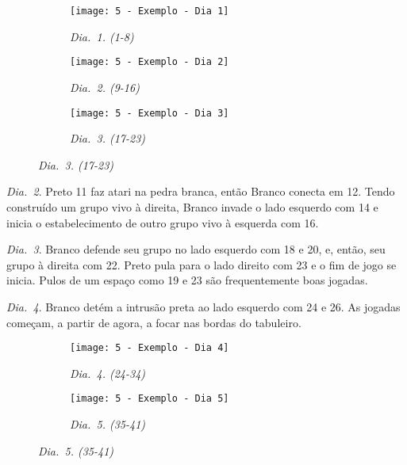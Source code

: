 \begin{figure}[h!]
  \centering
  \begin{subfigure}[t]{.3\textwidth}
    \centering
    \texttt{[image: 5 - Exemplo - Dia 1]}
    \captionsetup{justification=centering}
    \caption*{\emph{Dia.\@~1. (1-8)}}
  \end{subfigure}
  \hfill
  \begin{subfigure}[t]{.3\textwidth}
    \centering
    \texttt{[image: 5 - Exemplo - Dia 2]}
    \captionsetup{justification=centering}
    \caption*{\emph{Dia.\@~2. (9-16)}}
  \end{subfigure}
  \hfill
  \begin{subfigure}[t]{.3\textwidth}
    \centering
    \texttt{[image: 5 - Exemplo - Dia 3]}
    \captionsetup{justification=centering}
    \caption*{\emph{Dia.\@~3. (17-23)}}
  \end{subfigure}
\end{figure}

\emph{Dia.\@~2}. Preto 11 faz atari na pedra branca, então Branco conecta em 12. Tendo construído um grupo vivo à direita, Branco invade o lado esquerdo com 14 e inicia o estabelecimento de outro grupo vivo à esquerda com 16.

\emph{Dia.\@~3}. Branco defende seu grupo no lado esquerdo com 18 e 20, e, então, seu grupo à direita com 22. Preto pula para o lado direito com 23 e o fim de jogo se inicia. Pulos de um espaço como 19 e 23 são frequentemente boas jogadas.

\pagebreak

\emph{Dia.\@~4}. Branco detém a intrusão preta ao lado esquerdo com 24 e 26. As jogadas começam, a partir de agora, a focar nas bordas do tabuleiro.

\begin{figure}[h!]
  \centering
  \begin{subfigure}[t]{.3\textwidth}
    \centering
    \texttt{[image: 5 - Exemplo - Dia 4]}
    \captionsetup{justification=centering}
    \caption*{\emph{Dia.\@~4. (24-34)}}
  \end{subfigure}
  \hspace{1cm}
  \begin{subfigure}[t]{.3\textwidth}
    \centering
    \texttt{[image: 5 - Exemplo - Dia 5]}
    \captionsetup{justification=centering}
    \caption*{\emph{Dia.\@~5. (35-41)}}
  \end{subfigure}
\end{figure}

